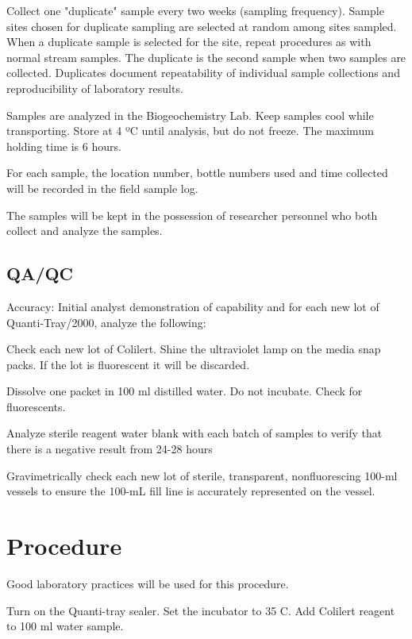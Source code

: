 \documentclass[12pt]{../SOP4_alpha}\usepackage[]{graphicx}\usepackage[]{xcolor}
\begin{document}
\NP Collect one "duplicate" sample every two weeks (sampling frequency).
Sample sites chosen for duplicate sampling are selected at random among
sites sampled. When a duplicate sample is selected for the site, repeat
procedures as with normal stream samples. The duplicate is the second
sample when two samples are collected. Duplicates document repeatability of
individual sample collections and reproducibility of laboratory results.

\NP Samples are analyzed in the Biogeochemistry Lab. Keep samples cool
while transporting. Store at 4 ºC until analysis, but do not freeze. The
maximum holding time is 6 hours.

\NP For each sample, the location number, bottle numbers used and time
collected will be recorded in the field sample log.

\NP The samples will be kept in the possession of researcher personnel who both
collect and analyze the samples.


\subsection{QA/QC}

\NP Accuracy: Initial analyst demonstration of capability and for each new lot of
Quanti-Tray/2000, analyze the following:

\NP Check each new lot of Colilert. Shine the ultraviolet lamp on the media snap packs. If the lot is
fluorescent it will be discarded.

\NP Dissolve one packet in 100 ml distilled water. Do not incubate.
Check for fluorescents.

\NP Analyze sterile reagent water blank with each batch of samples to
verify that there is a negative result from 24-28 hours

\NP Gravimetrically check each new lot of sterile, transparent, nonfluorescing 100-ml vessels to ensure the 100-mL fill line is
accurately represented on the vessel. 

\section{Procedure}

Good laboratory practices will be used for this procedure.

\NP Turn on the Quanti-tray sealer. 
\NP Set the incubator to 35 \degree C.
\NP Add Colilert reagent to 100 ml water sample.
\end{document}
